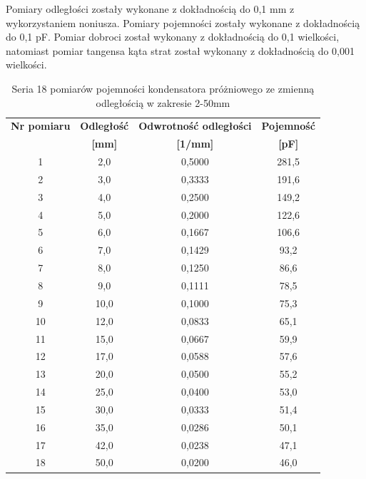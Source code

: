 \documentclass[polish, a4paper]{article}
\begin{document}
Pomiary odległości zostały wykonane z dokładnością do 0,1 mm z wykorzystaniem noniusza. Pomiary pojemności zostały wykonane z dokładnością do 0,1 pF. Pomiar dobroci został wykonany z dokładnością do 0,1 wielkości, natomiast pomiar tangensa kąta strat został wykonany z dokładnością do 0,001 wielkości.
\begin{table}[H]
    \centering
    \captionsetup{justification=centering}
    \begin{tabular}{|c|c|c|c|}
    \hline
        \textbf{Nr pomiaru} & \textbf{Odległość} & \textbf{Odwrotność odległości} & \textbf{Pojemność} \\
        & \textbf{[mm]} & \textbf{[1/mm]} & \textbf{[pF]} \\ \hline
        1 & 2,0 & 0,5000 & 281,5 \\ \hline
        2 & 3,0 & 0,3333 & 191,6 \\ \hline
        3 & 4,0 & 0,2500 & 149,2 \\ \hline
        4 & 5,0 & 0,2000 & 122,6 \\ \hline
        5 & 6,0 & 0,1667 & 106,6 \\ \hline
        6 & 7,0 & 0,1429 & 93,2 \\ \hline
        7 & 8,0 & 0,1250 & 86,6 \\ \hline
        8 & 9,0 & 0,1111 & 78,5 \\ \hline
        9 & 10,0 & 0,1000 & 75,3 \\ \hline
        10 & 12,0 & 0,0833 & 65,1 \\ \hline
        11 & 15,0 & 0,0667 & 59,9 \\ \hline
        12 & 17,0 & 0,0588 & 57,6 \\ \hline
        13 & 20,0 & 0,0500 & 55,2 \\ \hline
        14 & 25,0 & 0,0400 & 53,0 \\ \hline
        15 & 30,0 & 0,0333 & 51,4 \\ \hline
        16 & 35,0 & 0,0286 & 50,1 \\ \hline
        17 & 42,0 & 0,0238 & 47,1 \\ \hline
        18 & 50,0 & 0,0200 & 46,0 \\ \hline
    \end{tabular}
        \caption{Seria 18 pomiarów pojemności kondensatora próżniowego ze zmienną odległością w zakresie 2-50mm}
\end{table}
\end{document}
